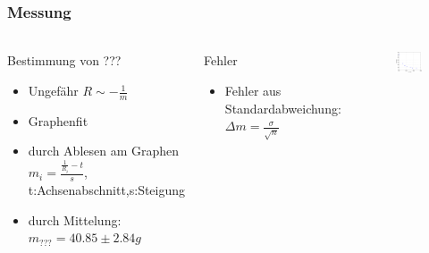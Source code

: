 \begin{frame}
    \frametitle{Messung}
    \framesubtitle{}
    \begin{columns}[c]
        \begin{block}{Bestimmung von ???}
             \begin{itemize}
                 \item Ungefähr $R \sim - \frac{1}{m}$
                 \item Graphenfit 
                 \item durch Ablesen am Graphen $m_i = \frac{
                 \frac{1}{R_i}-t}{s}$, t:Achsenabschnitt,s:Steigung
                 \item durch Mittelung: $m_{???} = 40.85 \pm 2.84g$
             \end{itemize}
        \end{block}
        \begin{block}{Fehler}
             \begin{itemize}
                 \item Fehler aus Standardabweichung: $\Delta m =
                 \frac{\sigma}{\sqrt{n}}$
             \end{itemize}
         \end{block}
         \begin{figure}[H]
         \begin{center}
                 \includegraphics[scale=0.3]{./img/plots/1d_mess.eps}
         \end{center}

\end{figure}
\end{columns}
\end{frame}
